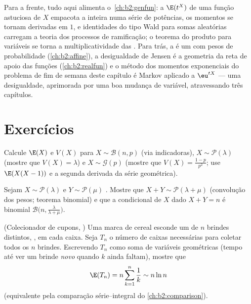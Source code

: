 \begin{remark}
Para a frente, tudo aqui alimenta o~\cref{ch:b2:genfun}: a
 $\E(t^X)$ de uma função astuciosa de $X$ empacota
a  inteira numa série de potências, os momentos se tornam
derivadas em $1$, e identidades do tipo Wald para somas aleatórias
carregam a teoria dos processos de ramificação; o teorema do produto para
variáveis  se torna a multiplicatividade das . Para trás, a  é um  com
pesos de probabilidade (\cref{ch:b2:affine}), a desigualdade de Jensen
é a geometria da reta de apoio das funções 
(\cref{ch:b2:realfun}) e o método dos momentos exponenciais do
problema de fim de semana deste capítulo é Markov aplicado a
$\eu^{tX}$ --- uma desigualdade, aprimorada por uma boa mudança
de variável, atravessando três capítulos.
\end{remark}

\section{Exercícios}

\begin{exercise}[$\star$]\label{exo:b2:randomvar:1}
Calcule $\E(X)$ e $V(X)$ para $X \sim \mathcal{B}(n, p)$ (via
indicadoras), $X \sim \mathcal{P}(\lambda)$ (mostre que $V(X) =
\lambda$) e $X \sim \mathcal{G}(p)$ (mostre que $V(X) =
\frac{1-p}{p^2}$; use $\E(X(X-1))$ e a segunda derivada da
série geométrica).
\end{exercise}

\begin{exercise}[$\star$]\label{exo:b2:randomvar:2}
Sejam $X \sim \mathcal{P}(\lambda)$ e $Y \sim \mathcal{P}(\mu)$
. Mostre que $X + Y \sim \mathcal{P}(\lambda + \mu)$
(convolução dos pesos; teorema binomial) e que a
 condicional de $X$ dado $X + Y = n$ é binomial
$\mathcal{B}\bigl(n, \frac{\lambda}{\lambda + \mu}\bigr)$.
\end{exercise}

\begin{exercise}[$\star$]\label{exo:b2:randomvar:3}
(Colecionador de cupons, ) Uma marca de cereal esconde um de $n$
brindes distintos, , em cada caixa. Seja $T_n$ o número de
caixas necessárias para coletar todos os $n$ brindes. Escrevendo $T_n$ como soma de
variáveis geométricas  (tempo até ver um brinde \emph{novo} quando
$k$ ainda faltam), mostre que
\[
\E(T_n) = n\sum_{k=1}^{n}\frac{1}{k} \sim n\ln n
\]
(equivalente pela comparação série--integral do
\cref{ch:b2:comparison}).
\end{exercise}

